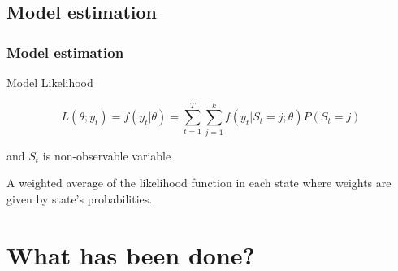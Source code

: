 \documentclass{beamer}
\begin{document}
\subsection{Model estimation}
\begin{frame}
\frametitle{Model estimation}







\begin{large}
	Model Likelihood
	
	$$L(\theta;y_{t}) = f(y_{t}|\theta) = \sum_{t=1}^{T}\sum_{j=1}^{k} f(y_{t}|S_{t}=j;\theta)P(S_{t}=j)$$
	
	\vspace{1em}
	
	and $S_{t}$ is non-observable variable
	\vspace{1em}
	
	A weighted average of the likelihood function in each state where weights are given by state's probabilities.
\end{large}

\end{frame}



\section{What has been done?}
\end{document}
